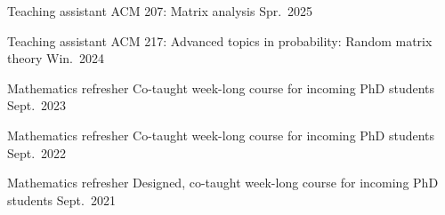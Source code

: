 


\begin{cvhonors}

  \cvhonor
    {Teaching assistant} %
    {ACM 207: Matrix analysis} %
    {} %
    {Spr.\ 2025} %
  
  \cvhonor
    {Teaching assistant} %
    {ACM 217: Advanced topics in probability: Random matrix theory} %
    {} %
    {Win.\ 2024} %
  
  \cvhonor
    {Mathematics refresher} %
    {Co-taught week-long course for incoming PhD students} %
    {} %
    {Sept.\ 2023} %
  
  \cvhonor
    {Mathematics refresher} %
    {Co-taught week-long course for incoming PhD students} %
    {} %
    {Sept.\ 2022} %

    \cvhonor
    {Mathematics refresher} %
    {Designed, co-taught week-long course for incoming PhD students} %
    {} %
    {Sept.\ 2021} %

 
\end{cvhonors}
